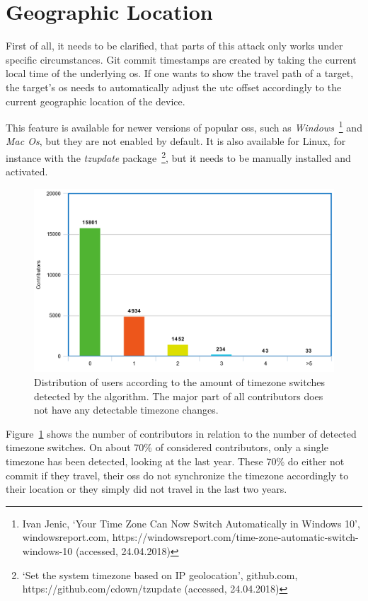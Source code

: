 \section{Geographic Location}

First of all, it needs to be clarified, that parts of this attack only works under specific circumstances.
Git commit timestamps are created by taking the current local time of the underlying \ac{os}.
If one wants to show the travel path of a target, the target's \ac{os} needs to automatically adjust the \ac{utc} offset accordingly to the current geographic location of the device.

This feature is available for newer versions of popular \acp{os}, such as \emph{Windows}~\footnote{Ivan Jenic, `Your Time Zone Can Now Switch Automatically in Windows 10', windowsreport.com, https://windowsreport.com/time-zone-automatic-switch-windows-10 (accessed, 24.04.2018)}
and \emph{Mac Os}, but they are not enabled by default.
It is also available for Linux, for instance with the \emph{tzupdate} package~\footnote{`Set the system timezone based on IP geolocation', github.com, https://github.com/cdown/tzupdate (accessed, 24.04.2018)}, but it needs to be manually installed and activated.

\begin{figure}[H]
    \includegraphics[scale=0.38]{./graphs/analysis/timezone-user-distribution}
    \centering
    \caption{Distribution of users according to the amount of timezone switches detected by the algorithm.
    The major part of all contributors does not have any detectable timezone changes.}\label{fig:timezone-distribution}
\end{figure}

Figure~\ref{fig:timezone-distribution} shows the number of contributors in relation to the number of detected timezone switches.
On about 70\% of considered contributors, only a single timezone has been detected, looking at the last year.
These 70\% do either not commit if they travel, their \acp{os} do not synchronize the timezone accordingly to their location or they simply did not travel in the last two years.

